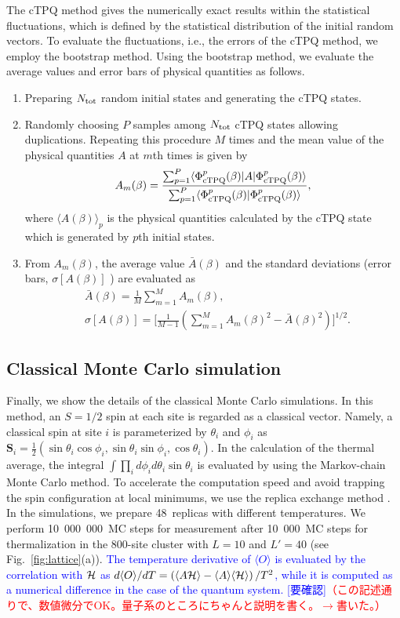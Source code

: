 \documentclass[reprint,amsmath,amssymb,aps,prx]{revtex4-2}
\newcommand{\red}[1]{\textcolor{red}{#1}}
\newcommand{\blue}[1]{\textcolor{blue}{#1}}
\begin{document}
The cTPQ method gives the numerically exact
results within the statistical fluctuations,
which is defined by the statistical distribution of the initial random vectors.
To evaluate the fluctuations, i.e., the errors of the cTPQ method, 
we employ the bootstrap method.
Using the bootstrap method,
we evaluate the average values and 
error bars of physical quantities as follows.
\begin{enumerate}
\item Preparing $N_{\rm tot}$ random initial states and generating the cTPQ states.
\item Randomly choosing $P$ samples among $N_{\rm tot}$ cTPQ states allowing duplications. 
Repeating this procedure $M$ times and the mean value of the physical quantities $A$ 
at $m$th times is given by 
\begin{align}
A_{m}(\beta) = \frac{\sum_{p=1}^{P}\langle \Phi_{\rm cTPQ}^{p}(\beta)|A|\Phi_{\rm cTPQ}^{p}(\beta)\rangle}{\sum_{p=1}^{P}\langle \Phi_{\rm cTPQ}^{p}(\beta)|\Phi_{\rm cTPQ}^{p}(\beta)\rangle},
\end{align}
where $\langle A(\beta)\rangle_{p}$ is the physical quantities calculated by the cTPQ state 
which is generated by $p$th initial states.
\item From $A_{m}(\beta)$, the 
average value $\bar{A}(\beta)$
and the standard deviations (error bars, $\sigma[A(\beta)]$ ) are 
evaluated as
\begin{align}
&\bar{A}(\beta) = \frac{1}{M}\sum_{m=1}^{M}A_{m}(\beta), \\
&\sigma[A(\beta)] = \Big[\frac{1}{M-1}(\sum_{m=1}^{M}A_{m}(\beta)^2-\bar{A}(\beta)^2)\Big]^{1/2}.
\end{align}
\end{enumerate}

  \subsection{Classical Monte Carlo simulation}
Finally, we show the details of the classical Monte Carlo simulations.
In this method, an $S=1/2$ spin at each site is regarded as a classical vector.
Namely, a classical spin at site $i$ is parameterized by $\theta_i$ and $\phi_i$ as
$\bm{S}_i = \frac{1}{2}(\sin\theta_i\cos\phi_i, \sin\theta_i\sin\phi_i, \cos\theta_i)$.
In the calculation of the thermal average, the integral $\int \prod_i d\phi_i d\theta_i \sin\theta_i$ is evaluated by using the Markov-chain Monte Carlo method.
To accelerate the computation speed and avoid trapping the spin configuration at local minimums, we use the replica exchange method \cite{Hukushima1996}.
In the simulations, we prepare 48~replicas with different temperatures.
We perform 10~000~000~MC steps for measurement after 10~000~MC steps for thermalization in the 800-site cluster with $L=10$ and $L'=40$ (see Fig.~\ref{fig:lattice}(a)).
\blue{The temperature derivative of $\langle O \rangle$ is evaluated by the correlation with ${\cal H}$ as  $d\langle O \rangle/dT=\left(\langle A{\cal H}\rangle -\langle A\rangle \langle {\cal H}\rangle \right)/T^2$, while it is computed as a numerical difference in the case of the quantum system.
[要確認]\red{（この記述通りで、数値微分でOK。量子系のところにちゃんと説明を書く。$\to$書いた。）}
}
\end{document}
